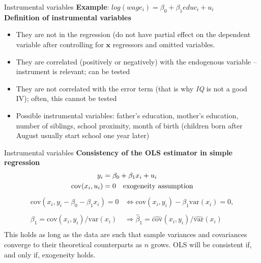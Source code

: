\documentclass[usenames,dvipsnames]{beamer}
\begin{document}

\begin{frame}{Instrumental variables}
\textbf{Example}:  $log(wage_i)=\beta_0+\beta_1educ_i+u_i$  \\
\vspace{0.3cm}
\textbf{Definition of instrumental variables}
\begin{itemize}
\item They are not in the regression (do not have partial effect on the dependent variable after controlling for $\bm{x}$ regressors and omitted variables.
\item They are correlated (positively or negatively) with the endogenous variable  – instrument is relevant; can be tested
\item They are not correlated with the error term (that is why \textit{IQ} is not a good IV); often, this cannot be tested
\item Possible instrumental variables: father's education, mother's education, number of siblings, school proximity, month of birth (children born after August usually start school one year later)
\end{itemize}
\end{frame}

\begin{frame}{Instrumental variables}
\textbf{Consistency of the OLS estimator  in simple regression}
\begin{align*}
y_i & =\beta_0+\beta_1 x_i+u_i \\
\mathrm{cov}(x_i, u_i) & = 0 \quad \textnormal{exogeneity assumption}
\end{align*}
\begin{align*}
\mathrm{cov}(x_i,y_i-\beta_0-\beta_1x_i) = 0 &\Leftrightarrow \mathrm{cov}(x_i,y_i)-\beta_1 \mathrm{var}(x_i) =0,  \\
\\
\beta_1  = \mathrm{cov}(x_i,y_i)/\mathrm{var}(x_i) & \Rightarrow \hat{\beta}_1  = \widehat{\mathrm{cov}}(x_i,y_i)/\widehat{\mathrm{var}}(x_i)\\
\end{align*}
This holds as long as the data are such that sample variances and covariances converge to their theoretical counterparts as $n$ grows. OLS will be consistent if, and only if, exogeneity holds.
\end{frame}
\end{document}
